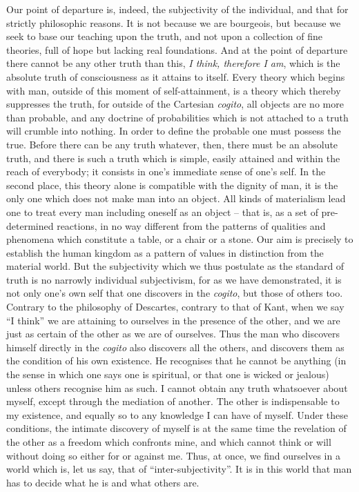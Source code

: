 \documentclass[12pt]{article}
\begin{document}
Our point of departure is, indeed, the subjectivity of the individual, and that for strictly philosophic reasons. It is not because we are bourgeois, but because we seek to base our teaching upon the truth, and not upon a collection of fine theories, full of hope but lacking real foundations. And at the point of departure there cannot be any other truth than this, \textit{I think, therefore I am}, which is the absolute truth of consciousness as it attains to itself. Every theory which begins with man, outside of this moment of self-attainment, is a theory which thereby suppresses the truth, for outside of the Cartesian \textit{cogito}, all objects are no more than probable, and any doctrine of probabilities which is not attached to a truth will crumble into nothing. In order to define the probable one must possess the true. Before there can be any truth whatever, then, there must be an absolute truth, and there is such a truth which is simple, easily attained and within the reach of everybody; it consists in one’s immediate sense of one’s self.
\clearpage
In the second place, this theory alone is compatible with the dignity of man, it is the only one which does not make man into an object. All kinds of materialism lead one to treat every man including oneself as an object – that is, as a set of pre-determined reactions, in no way different from the patterns of qualities and phenomena which constitute a table, or a chair or a stone. Our aim is precisely to establish the human kingdom as a pattern of values in distinction from the material world. But the subjectivity which we thus postulate as the standard of truth is no narrowly individual subjectivism, for as we have demonstrated, it is not only one’s own self that one discovers in the \textit{cogito}, but those of others too. Contrary to the philosophy of Descartes, contrary to that of Kant, when we say “I think” we are attaining to ourselves in the presence of the other, and we are just as certain of the other as we are of ourselves. Thus the man who discovers himself directly in the \textit{cogito} also discovers all the others, and discovers them as the condition of his own existence. He recognises that he cannot be anything (in the sense in which one says one is spiritual, or that one is wicked or jealous) unless others recognise him as such. I cannot obtain any truth whatsoever about myself, except through the mediation of another. The other is indispensable to my existence, and equally so to any knowledge I can have of myself. Under these conditions, the intimate discovery of myself is at the same time the revelation of the other as a freedom which confronts mine, and which cannot think or will without doing so either for or against me. Thus, at once, we find ourselves in a world which is, let us say, that of “inter-subjectivity”. It is in this world that man has to decide what he is and what others are.
\end{document}
